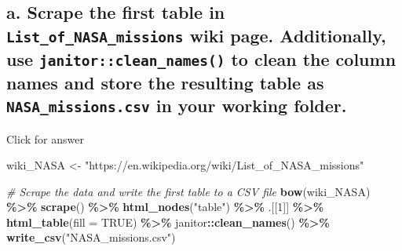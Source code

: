 \documentclass[
]{book}
\newenvironment{Shaded}{\begin{snugshade}}{\end{snugshade}}
\newcommand{\AttributeTok}[1]{\textcolor[rgb]{0.13,0.29,0.53}{#1}}
\newcommand{\CommentTok}[1]{\textcolor[rgb]{0.56,0.35,0.01}{\textit{#1}}}
\newcommand{\ConstantTok}[1]{\textcolor[rgb]{0.56,0.35,0.01}{#1}}
\newcommand{\DecValTok}[1]{\textcolor[rgb]{0.00,0.00,0.81}{#1}}
\newcommand{\FunctionTok}[1]{\textcolor[rgb]{0.13,0.29,0.53}{\textbf{#1}}}
\newcommand{\NormalTok}[1]{#1}
\newcommand{\OtherTok}[1]{\textcolor[rgb]{0.56,0.35,0.01}{#1}}
\newcommand{\SpecialCharTok}[1]{\textcolor[rgb]{0.81,0.36,0.00}{\textbf{#1}}}
\newcommand{\StringTok}[1]{\textcolor[rgb]{0.31,0.60,0.02}{#1}}
\begin{document}
\hypertarget{a.-scrape-the-first-table-in-list_of_nasa_missions-wiki-page.-additionally-use-janitorclean_names-to-clean-the-column-names-and-store-the-resulting-table-as-nasa_missions.csv-in-your-working-folder.}{%
\subsection{\texorpdfstring{a. Scrape the first table in \texttt{List\_of\_NASA\_missions} wiki page. Additionally, use \texttt{janitor::clean\_names()} to clean the column names and store the resulting table as \texttt{NASA\_missions.csv} in your working folder.}{a. Scrape the first table in List\_of\_NASA\_missions wiki page. Additionally, use janitor::clean\_names() to clean the column names and store the resulting table as NASA\_missions.csv in your working folder.}}\label{a.-scrape-the-first-table-in-list_of_nasa_missions-wiki-page.-additionally-use-janitorclean_names-to-clean-the-column-names-and-store-the-resulting-table-as-nasa_missions.csv-in-your-working-folder.}}

Click for answer

\begin{Shaded}
\begin{Highlighting}[]
\NormalTok{wiki\_NASA }\OtherTok{\textless{}{-}} \StringTok{"https://en.wikipedia.org/wiki/List\_of\_NASA\_missions"}

\CommentTok{\# Scrape the data and write the first table to a CSV file}
\FunctionTok{bow}\NormalTok{(wiki\_NASA) }\SpecialCharTok{\%\textgreater{}\%} 
  \FunctionTok{scrape}\NormalTok{() }\SpecialCharTok{\%\textgreater{}\%} 
  \FunctionTok{html\_nodes}\NormalTok{(}\StringTok{"table"}\NormalTok{) }\SpecialCharTok{\%\textgreater{}\%} 
\NormalTok{  .[[}\DecValTok{1}\NormalTok{]] }\SpecialCharTok{\%\textgreater{}\%} 
  \FunctionTok{html\_table}\NormalTok{(}\AttributeTok{fill =} \ConstantTok{TRUE}\NormalTok{) }\SpecialCharTok{\%\textgreater{}\%} 
\NormalTok{  janitor}\SpecialCharTok{::}\FunctionTok{clean\_names}\NormalTok{() }\SpecialCharTok{\%\textgreater{}\%}
  \FunctionTok{write\_csv}\NormalTok{(}\StringTok{"NASA\_missions.csv"}\NormalTok{)}
\end{Highlighting}
\end{Shaded}
\end{document}
